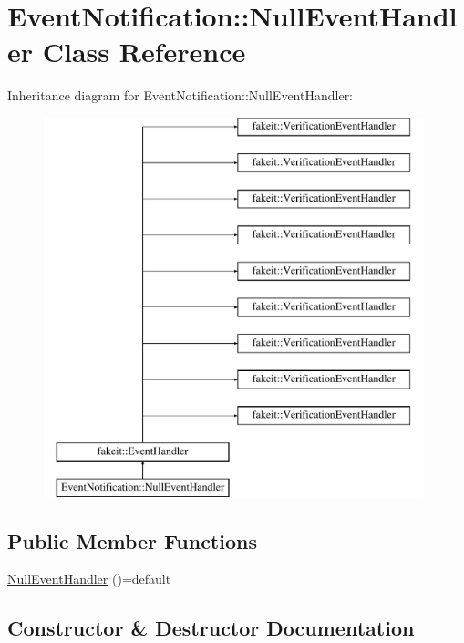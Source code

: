 \hypertarget{classEventNotification_1_1NullEventHandler}{}\section{Event\+Notification\+::Null\+Event\+Handler Class Reference}
\label{classEventNotification_1_1NullEventHandler}
Inheritance diagram for Event\+Notification\+::Null\+Event\+Handler\+:\begin{figure}[H]
\begin{center}
\leavevmode
\includegraphics[height=11.000000cm]{classEventNotification_1_1NullEventHandler}
\end{center}
\end{figure}
\subsection*{Public Member Functions}
\begin{DoxyCompactItemize}
\item 
\mbox{\hyperlink{classEventNotification_1_1NullEventHandler_ac9d4a4c8fb29c9c8c9b821f5e9f6440f}{Null\+Event\+Handler}} ()=default
\end{DoxyCompactItemize}


\subsection{Constructor \& Destructor Documentation}
\mbox{\label{classEventNotification_1_1NullEventHandler_ac9d4a4c8fb29c9c8c9b821f5e9f6440f}} 

